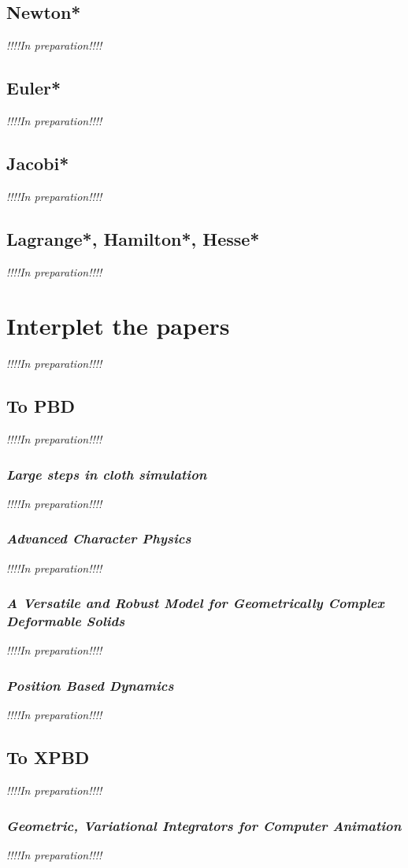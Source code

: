 \documentclass[pdflatex,sn-mathphys-num]{sn-jnl}%
\theoremstyle{thmstyleone}%
\theoremstyle{thmstyletwo}%
\theoremstyle{thmstylethree}%
\newcommand{\inprep}{
	\begin{center}
		\sl\rm {!!!!In preparation!!!!}
\end{center}}
\begin{document}
\subsection{Newton*}
\inprep
\subsection{Euler*}
\inprep
\subsection{Jacobi*}
\inprep
\subsection{Lagrange*, Hamilton*, Hesse*}
\inprep

\section{Interplet the papers}
\inprep
\subsection{To PBD}
\inprep
\subsubsection{{\sl Large steps in cloth simulation}\cite{LargeStepBaraff}}
\inprep
\subsubsection{{\sl Advanced Character Physics}\cite{Jakobsen2003AdvancedCP}}
\inprep
\subsubsection{\small{\sl A Versatile and Robust Model for Geometrically Complex Deformable Solids}\cite{VersatileTeschner}}
\inprep
\subsubsection{{\sl Position Based Dynamics}\cite{PBD}}
\inprep

\subsection{To XPBD}
\inprep
\subsubsection{{\sl Geometric, Variational Integrators for Computer Animation}\cite{VariationalIntegrators2006}}
\inprep
\end{document}
